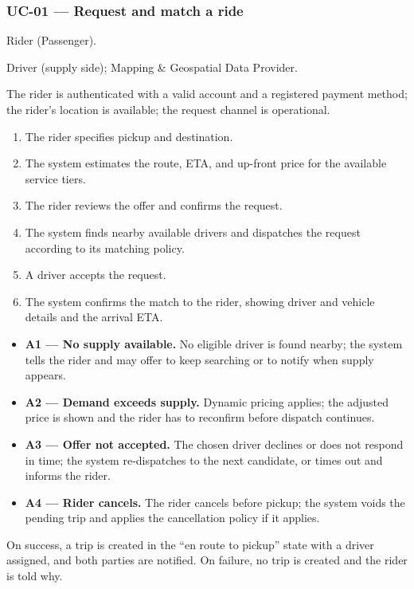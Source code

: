 \subsubsection*{UC-01 --- Request and match a ride}

\begin{description}[leftmargin=2.4cm,style=nextline,font=\normalfont\bfseries]
  \item[Primary actor] Rider (Passenger).
  \item[Secondary actors] Driver (supply side); Mapping \& Geospatial Data
        Provider.
  \item[Preconditions] The rider is authenticated with a valid account and a
        registered payment method; the rider's location is available; the
        request channel is operational.
  \item[Main flow]
    \begin{enumerate}[leftmargin=1.6em,itemsep=0.15em]
      \item The rider specifies pickup and destination.
      \item The system estimates the route, ETA, and up-front price for the
            available service tiers.
      \item The rider reviews the offer and confirms the request.
      \item The system finds nearby available drivers and dispatches the
            request according to its matching policy.
      \item A driver accepts the request.
      \item The system confirms the match to the rider, showing driver and
            vehicle details and the arrival ETA.
    \end{enumerate}
  \item[Alternative flows]
    \begin{itemize}[leftmargin=1.6em,itemsep=0.15em]
      \item \textbf{A1 --- No supply available.} No eligible driver is found
            nearby; the system tells the rider and may offer to keep
            searching or to notify when supply appears.
      \item \textbf{A2 --- Demand exceeds supply.} Dynamic pricing applies;
            the adjusted price is shown and the rider has to reconfirm before
            dispatch continues.
      \item \textbf{A3 --- Offer not accepted.} The chosen driver declines or
            does not respond in time; the system re-dispatches to the next
            candidate, or times out and informs the rider.
      \item \textbf{A4 --- Rider cancels.} The rider cancels before pickup;
            the system voids the pending trip and applies the cancellation
            policy if it applies.
    \end{itemize}
  \item[Postconditions] On success, a trip is created in the
        ``en route to pickup'' state with a driver assigned, and both parties
        are notified. On failure, no trip is created and the rider is told
        why.
\end{description}

